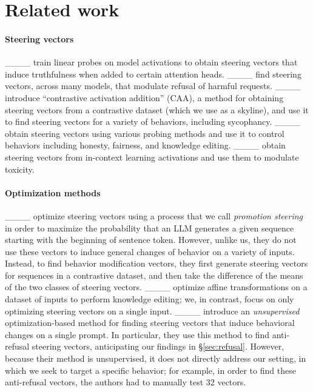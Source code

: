 \section{Related work}
\paragraph{Steering vectors}
____ train linear probes on model activations to obtain steering vectors that induce truthfulness when added to certain attention heads.
____ find steering vectors, across many models, that modulate refusal of harmful requests. ____ introduce \enquote{contrastive activation addition} (CAA), a method for obtaining steering vectors from a contrastive dataset (which we use as a skyline), and use it to find steering vectors for a variety of behaviors, including sycophancy. ____ obtain steering vectors using various probing methods and use it to control behaviors including honesty, fairness, and knowledge editing. ____ obtain steering vectors from in-context learning activations and use them to modulate toxicity. 

\paragraph{Optimization methods} ____ optimize steering vectors using a process that we call \textit{promotion steering} in order to maximize the probability that an LLM generates a given sequence starting with the beginning of sentence token. However, unlike us, they do not use these vectors to induce general changes of behavior on a variety of inputs. Instead, to find behavior modification vectors, they first generate steering vectors for sequences in a contrastive dataset, and then take the difference of the means of the two classes of steering vectors. ____ optimize affine transformations on a dataset of inputs to perform knowledge editing; we, in contrast, focus on only optimizing steering vectors on a single input. ____ introduce an \textit{unsupervised} optimization-based method for finding steering vectors that induce behavioral changes on a single prompt. In particular, they use this method to find anti-refusal steering vectors, anticipating our findings in \S\ref{sec:refusal}. However, because their method is unsupervised, it does not directly address our setting, in which we seek to target a specific behavior; for example, in order to find these anti-refusal vectors, the authors had to manually test 32 vectors.

